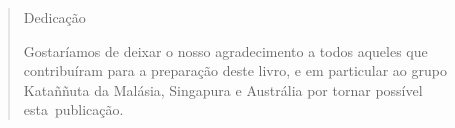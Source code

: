 \cleartorecto
\thispagestyle{empty}

\mbox{}\vfill

\begin{verse}
\centering
Dedicação

\bigskip

Gostaríamos de deixar o nosso agradecimento a todos aqueles que
contribuíram para a preparação deste livro, e em particular ao grupo
Kataññuta da Malásia, Singapura e Austrália por tornar possível esta~publicação.

\end{verse}

\vfill\mbox{}
